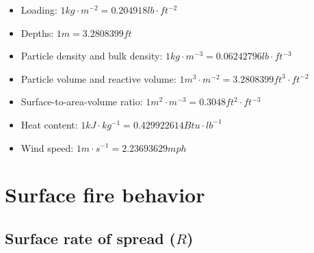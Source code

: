 \documentclass[]{book}
\providecommand{\tightlist}{%
  \setlength{\itemsep}{0pt}\setlength{\parskip}{0pt}}
\begin{document}
\begin{itemize}
\tightlist
\item
  Loading: \(1 kg\cdot m^{-2} = 0.204918 lb\cdot ft^{-2}\)
\item
  Depths: \(1m = 3.2808399ft\)
\item
  Particle density and bulk density: \(1 kg\cdot m^{-3} = 0.06242796 lb\cdot ft^{-3}\)
\item
  Particle volume and reactive volume: \(1 m^{3}\cdot m^{-2} = 3.2808399 ft^{3}\cdot ft^{-2}\)
\item
  Surface-to-area-volume ratio: \(1 m^{2}\cdot m^{-3} = 0.3048 ft^{2}\cdot ft^{-3}\)
\item
  Heat content: \(1kJ\cdot kg^{-1} = 0.429922614 Btu\cdot lb^{-1}\)
\item
  Wind speed: \(1 m \cdot s^{-1} = 2.23693629 mph\)
\end{itemize}

\hypertarget{surface-fire-behavior}{%
\section{Surface fire behavior}\label{surface-fire-behavior}}

\hypertarget{surface-rate-of-spread-r}{%
\subsection{\texorpdfstring{Surface rate of spread (\(R\))}{Surface rate of spread (R)}}\label{surface-rate-of-spread-r}}
\end{document}
